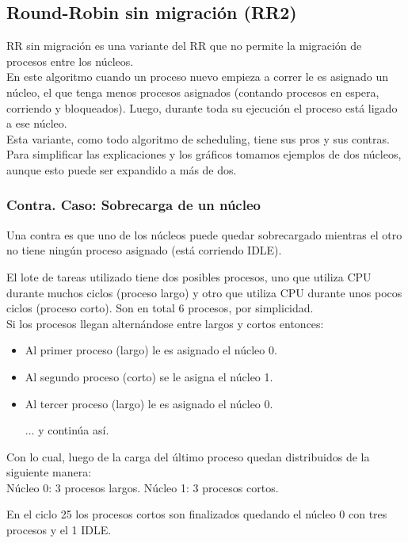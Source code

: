 \subsection{Round-Robin sin migración (RR2)}

RR sin migración es una variante del RR que no permite la migración de procesos
entre los núcleos.\\

En este algoritmo cuando un proceso nuevo empieza a correr le es asignado
un núcleo, el que tenga menos procesos asignados
(contando procesos en espera, corriendo y bloqueados).
Luego, durante toda su ejecución el proceso está ligado a ese núcleo.\\

Esta variante, como todo algoritmo de scheduling, tiene sus pros y sus contras.\\
Para simplificar las explicaciones y los gráficos tomamos ejemplos de 
dos núcleos, aunque esto puede ser expandido a más de dos.\\

\subsubsection{Contra. Caso: Sobrecarga de un núcleo}
Una contra es que uno de los núcleos puede quedar sobrecargado mientras el
otro no tiene ningún proceso asignado (está corriendo IDLE).

El lote de tareas utilizado tiene dos posibles procesos, uno que utiliza CPU durante muchos ciclos (proceso largo)
y otro que utiliza CPU durante unos pocos ciclos (proceso corto). Son en total 6 procesos, por simplicidad.\\
Si los procesos llegan alternándose entre largos y cortos entonces:
\begin{itemize}
\item Al primer proceso (largo) le es asignado el núcleo 0.
\item Al segundo proceso (corto) se le asigna el núcleo 1.
\item Al tercer proceso (largo) le es asignado el núcleo 0.

... y continúa así.
\end{itemize}

Con lo cual, luego de la carga del último proceso quedan distribuidos de la siguiente manera:\\ 
Núcleo 0: 3 procesos largos. Núcleo 1: 3 procesos cortos.

En el ciclo 25 los procesos cortos son finalizados quedando el núcleo 0 con tres procesos y el 1 IDLE.\\

